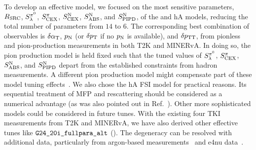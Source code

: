 To develop an effective model, we focused on the most sensitive parameters, $R_\textrm{SRC}$, $S_\lambda^{\pi^{0}}$, $S_\textrm{CEX}^{\pi}$, $S_\textrm{CEX}^\textrm{N}$, $S_\textrm{ABS}^\textrm{N}$, and $S_\textrm{PIPD}^\textrm{N}$, of the \sfcfg and hA models, reducing the total number of parameters from $14$ to $6$. The corresponding best combination of observables is $\delta\alpha_\textrm{T}$, $p_\textrm{N}$ (or $\delta p_\textrm{T}$ if no $p_\textrm{N}$ is available), and $\delta p_\textrm{TT}$, from pionless and pion-production measurements in both T2K and MINERvA. 
In doing so, the pion production model is held fixed such that the tuned values of $S_\lambda^{\pi^{0}}$, $S_\textrm{CEX}^{\pi}$, $S_\textrm{ABS}^\textrm{N}$, and $S_\textrm{PIPD}^\textrm{N}$ depart from the established constraints from hadron measurements. 
A different pion production model might compensate part of these model tuning effects~\cite{Yan:2024kkg}. 
We also chose the hA FSI model for practical reasons. Its sequential treatment of MFP and rescattering should be considered as a numerical advantage (as was also pointed out in Ref.~\cite{GENIE:2022qrc}). Other more sophisticated models could be considered in future tunes.  With the existing four TKI measurements from T2K and MINERvA, we have also derived other effective tunes like $\texttt{G24\_20i\_fullpara\_alt}$ (\gT). The degeneracy can be resolved with additional data, particularly from argon-based measurements~\cite{MicroBooNE:2022emb, MicroBooNE:2023cmw, MicroBooNE:2023tzj, MicroBooNE:2023wzy, MicroBooNE:2024tmp, MicroBooNE:2015bmn} and e4nu data~\cite{CLAS:2021neh}.